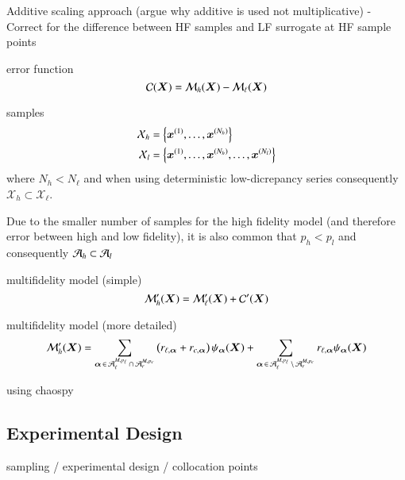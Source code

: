 Additive scaling approach (argue why additive is used not multiplicative)
- Correct for the difference between HF samples and LF surrogate at HF sample points

error function
\begin{equation}
    \mathcal{C}(\bm X) = \mathcal{M}_h(\bm X) - \mathcal{M}_\ell(\bm X)
\end{equation}

samples
\begin{align}
    \mathcal{X}_h &= \left\{ \bm{x}^{(1)}, \dots, \bm{x}^{(N_h)}\right\} \\
    \mathcal{X}_l &= \left\{ \bm{x}^{(1)}, \dots, \bm{x}^{(N_h)}, \dots, \bm{x}^{(N_l)}\right\}
\end{align}
where $N_h < N_\ell$ and when using deterministic low-dicrepancy series
consequently $\mathcal{X}_h \subset \mathcal{X}_\ell$.

Due to the smaller number of samples for the high fidelity model (and therefore error between high and low fidelity), it is also
common that $p_h < p_l$ and consequently $\mathcal{A}_h \subset \mathcal{A}_l$

multifidelity model (simple)
\begin{equation}
    \mathcal{M}_h'(\bm X) = \mathcal{M}_\ell'(\bm X) + \mathcal{C}'(\bm X)
\end{equation}

multifidelity model (more detailed)
\begin{equation}
    \mathcal{M}_h' (\bm X) = \sum_{{\bm{\alpha}}\,\in\,\mathcal{A}_\ell^{M,p_\ell} \,\cap\, \mathcal{A}_r^{M,p_c}}
    \left(
     r_{\ell,{\bm{\alpha}}} + r_{c,{\bm{\alpha}}}
    \right) \psi_{\bm{\alpha}}(\bm X) + 
    \sum_{{\bm{\alpha}}\,\in\,\mathcal{A}_\ell^{M,p_\ell} \,\setminus\, \mathcal{A}_r^{M,p_c}}
    r_{\ell,{\bm{\alpha}}} \psi_{\bm{\alpha}}(\bm X)
\end{equation}

using chaospy \cite{feinberg_chaospy_2015}

\subsection{Experimental Design}
\label{sec:sampling}


sampling / experimental design / collocation points

